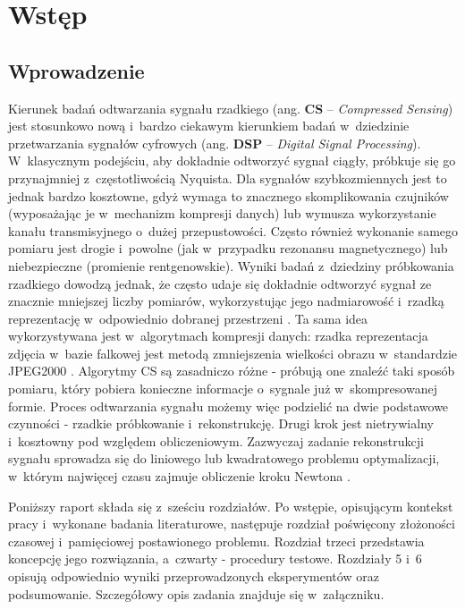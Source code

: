 \section{Wstęp}
\subsection{Wprowadzenie}
Kierunek badań odtwarzania sygnału rzadkiego (ang. \textbf{CS} – \textit{Compressed Sensing}) jest stosunkowo nową i bardzo ciekawym kierunkiem badań w~dziedzinie przetwarzania sygnałów cyfrowych (ang. \textbf{DSP} – \textit{Digital Signal Processing}). W~klasycznym podejściu, aby dokładnie odtworzyć sygnał ciągły, próbkuje się go przynajmniej z~częstotliwością Nyquista. Dla sygnałów szybkozmiennych jest to jednak bardzo kosztowne, gdyż wymaga to znacznego skomplikowania czujników (wyposażając je w~mechanizm kompresji danych) lub wymusza wykorzystanie kanału transmisyjnego o~dużej przepustowości. Często również wykonanie samego pomiaru jest drogie i~powolne (jak w~przypadku rezonansu magnetycznego) lub niebezpieczne (promienie rentgenowskie). Wyniki badań z~dziedziny próbkowania rzadkiego dowodzą jednak, że często udaje się dokładnie odtworzyć sygnał ze znacznie mniejszej liczby pomiarów, wykorzystując jego nadmiarowość i~rzadką reprezentację w~odpowiednio dobranej przestrzeni \cite{IntroductionCS}. Ta sama idea wykorzystywana jest w~algorytmach kompresji danych: rzadka reprezentacja zdjęcia w~bazie falkowej jest metodą zmniejszenia wielkości obrazu w~standardzie JPEG2000 \cite{JPEG2000}. Algorytmy CS są zasadniczo różne - próbują one znaleźć taki sposób pomiaru, który pobiera konieczne informacje o~sygnale już w~skompresowanej formie. Proces odtwarzania sygnału możemy więc podzielić na dwie podstawowe czynności - rzadkie próbkowanie i~rekonstrukcję. Drugi krok jest nietrywialny i~kosztowny pod względem obliczeniowym. Zazwyczaj zadanie rekonstrukcji sygnału sprowadza się do liniowego lub kwadratowego problemu optymalizacji, w~którym najwięcej czasu zajmuje obliczenie kroku Newtona \cite{L1MagicNotes}.

Poniższy raport składa się z~sześciu rozdziałów. Po wstępie, opisującym kontekst pracy i~wykonane badania literaturowe, następuje rozdział poświęcony złożoności czasowej i~pamięciowej postawionego problemu. Rozdział trzeci przedstawia koncepcję jego rozwiązania, a~czwarty - procedury testowe. Rozdziały 5 i~6 opisują odpowiednio wyniki przeprowadzonych eksperymentów oraz podsumowanie. Szczegółowy opis zadania znajduje się w~załączniku.
